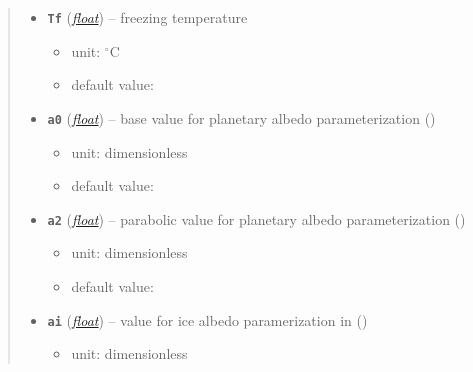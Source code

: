 \documentclass[a4paper,10pt,english]{sphinxmanual}
\begin{document}
\begin{fulllineitems}
\begin{quote}
\begin{description}
\begin{itemize}
\item {} 
\textbf{\texttt{Tf}} (\href{http://docs.python.org/2.7/library/functions.html\#float}{\emph{float}}) -- 
freezing temperature
\begin{itemize}
\item {} 
unit: \(^{\circ} \textrm{C}\)

\item {} 
default value: 

\end{itemize}


\item {} 
\textbf{\texttt{a0}} (\href{http://docs.python.org/2.7/library/functions.html\#float}{\emph{float}}) -- 
base value for planetary albedo parameterization
{\hyperref[api/climlab.surface:climlab.surface.albedo.StepFunctionAlbedo]{\emph{}}} ()
\begin{itemize}
\item {} 
unit: dimensionless

\item {} 
default value: 

\end{itemize}


\item {} 
\textbf{\texttt{a2}} (\href{http://docs.python.org/2.7/library/functions.html\#float}{\emph{float}}) -- 
parabolic value for planetary  albedo parameterization
{\hyperref[api/climlab.surface:climlab.surface.albedo.StepFunctionAlbedo]{\emph{}}} ()
\begin{itemize}
\item {} 
unit: dimensionless

\item {} 
default value: 

\end{itemize}


\item {} 
\textbf{\texttt{ai}} (\href{http://docs.python.org/2.7/library/functions.html\#float}{\emph{float}}) -- 
value for ice albedo paramerization in
{\hyperref[api/climlab.surface:climlab.surface.albedo.StepFunctionAlbedo]{\emph{}}} ()
\begin{itemize}
\item {} 
unit: dimensionless


\end{itemize}
\end{itemize}
\end{description}
\end{quote}
\end{fulllineitems}
\end{document}
